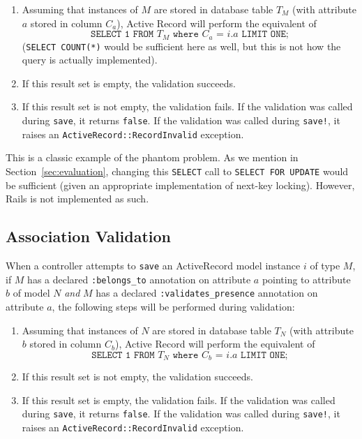 \begin{enumerate} 
\small

\item Assuming that instances of $M$ are stored in database table $T_M$ (with attribute $a$ stored in column $C_a$), Active Record will perform the equivalent of $$\texttt{SELECT 1 FROM $T_M$ where $C_a$ = $i.a$ LIMIT ONE;}$$ (\texttt{SELECT COUNT(*)} would be sufficient here as well, but this is not how the query is actually implemented).

\item If this result set is empty, the validation succeeds.

\item If this result set is not empty, the validation fails. If the validation was called during \texttt{save}, it returns \texttt{false}. If the validation was called during \texttt{save!}, it raises an \texttt{ActiveRecord::RecordInvalid} exception.

\end{enumerate}

This is a classic example of the phantom problem. As we mention in Section~\ref{sec:evaluation}, changing this \texttt{SELECT} call to \texttt{SELECT FOR UPDATE} would be sufficient (given an appropriate implementation of next-key locking). However, Rails is not implemented as such.

\subsection{Association Validation}
\label{sec:appendix-association-behavior}

 When a controller attempts to \texttt{save} an ActiveRecord model instance $i$ of type $M$, if $M$ has a declared \texttt{:belongs\_to} annotation on attribute $a$ pointing to attribute $b$ of model $N$ \textit{and} $M$ has a declared \texttt{:validates\_presence} annotation on attribute $a$, the following steps will be performed during validation:

\begin{enumerate} 
\small
\item Assuming that instances of $N$ are stored in database table $T_N$ (with attribute $b$ stored in column $C_b$), Active Record will perform the equivalent of $$\texttt{SELECT 1 FROM $T_N$ where $C_b$ = $i.a$ LIMIT ONE;}$$

\item If this result set is not empty, the validation succeeds.

\item If this result set is empty, the validation fails. If the validation was called during \texttt{save}, it returns \texttt{false}. If the validation was called during \texttt{save!}, it raises an \texttt{ActiveRecord::RecordInvalid} exception.

\end{enumerate}

